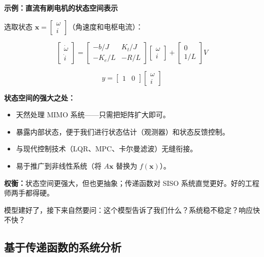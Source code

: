 \textbf{示例：直流有刷电机的状态空间表示}

选取状态 $\mathbf{x} = \begin{bmatrix} \omega \\ i \end{bmatrix}$（角速度和电枢电流）：

\begin{equation}
\begin{bmatrix} \dot{\omega} \\ \dot{i} \end{bmatrix} =
\begin{bmatrix} -b/J & K_t/J \\ -K_e/L & -R/L \end{bmatrix}
\begin{bmatrix} \omega \\ i \end{bmatrix} +
\begin{bmatrix} 0 \\ 1/L \end{bmatrix} V
\end{equation}

\begin{equation}
y = \begin{bmatrix} 1 & 0 \end{bmatrix} \begin{bmatrix} \omega \\ i \end{bmatrix}
\end{equation}

\textbf{状态空间的强大之处：}
\begin{itemize}
    \item 天然处理 MIMO 系统——只需把矩阵扩大即可。
    \item 暴露内部状态，便于我们进行状态估计（观测器）和状态反馈控制。
    \item 与现代控制技术（LQR、MPC、卡尔曼滤波）无缝衔接。
    \item 易于推广到非线性系统（将 $A\mathbf{x}$ 替换为 $f(\mathbf{x})$）。
\end{itemize}

\textbf{权衡：}状态空间更强大，但也更抽象；传递函数对 SISO 系统直觉更好。好的工程师两手都得硬。

模型建好了，接下来自然要问：这个模型告诉了我们什么？系统稳不稳定？响应快不快？

\subsection{基于传递函数的系统分析}
\label{sec:system_analysis_tf}

